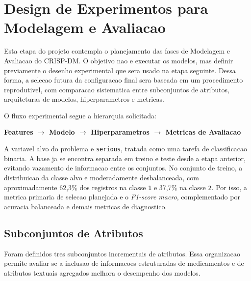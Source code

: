 \section{Design de Experimentos para Modelagem e Avaliacao}

Esta etapa do projeto contempla o planejamento das fases de Modelagem e Avaliacao do CRISP-DM. O objetivo nao e executar os modelos, mas definir previamente o desenho experimental que sera usado na etapa seguinte. Dessa forma, a selecao futura da configuracao final sera baseada em um procedimento reprodutivel, com comparacao sistematica entre subconjuntos de atributos, arquiteturas de modelos, hiperparametros e metricas.

O fluxo experimental segue a hierarquia solicitada:

\begin{center}
\textbf{Features $\rightarrow$ Modelo $\rightarrow$ Hiperparametros $\rightarrow$ Metricas de Avaliacao}
\end{center}

A variavel alvo do problema e \texttt{serious}, tratada como uma tarefa de classificacao binaria. A base ja se encontra separada em treino e teste desde a etapa anterior, evitando vazamento de informacao entre os conjuntos. No conjunto de treino, a distribuicao da classe alvo e moderadamente desbalanceada, com aproximadamente 62,3\% dos registros na classe \texttt{1} e 37,7\% na classe \texttt{2}. Por isso, a metrica primaria de selecao planejada e o \textit{F1-score macro}, complementado por acuracia balanceada e demais metricas de diagnostico.

\subsection{Subconjuntos de Atributos}

Foram definidos tres subconjuntos incrementais de atributos. Essa organizacao permite avaliar se a inclusao de informacoes estruturadas de medicamentos e de atributos textuais agregados melhora o desempenho dos modelos.

